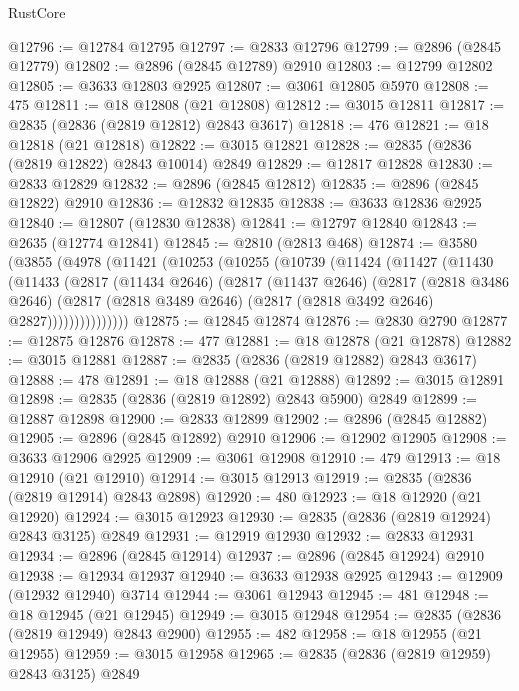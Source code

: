 \begin{lexlean}{RustCore}
\begin{coremodule}
@12796 := @12784 @12795
@12797 := @2833 @12796
@12799 := @2896 (@2845 @12779)
@12802 := @2896 (@2845 @12789) @2910
@12803 := @12799 @12802
@12805 := @3633 @12803 @2925
@12807 := @3061 @12805 @5970
@12808 := 475
@12811 := @18 @12808 (@21 @12808)
@12812 := @3015 @12811
@12817 := @2835 (@2836 (@2819 @12812) @2843 @3617)
@12818 := 476
@12821 := @18 @12818 (@21 @12818)
@12822 := @3015 @12821
@12828 := @2835 (@2836 (@2819 @12822) @2843 @10014) @2849
@12829 := @12817 @12828
@12830 := @2833 @12829
@12832 := @2896 (@2845 @12812)
@12835 := @2896 (@2845 @12822) @2910
@12836 := @12832 @12835
@12838 := @3633 @12836 @2925
@12840 := @12807 (@12830 @12838)
@12841 := @12797 @12840
@12843 := @2635 (@12774 @12841)
@12845 := @2810 (@2813 @468)
@12874 := @3580
    (@3855
      (@4978
        (@11421
          (@10253
            (@10255
              (@10739
                (@11424
                  (@11427
                    (@11430
                      (@11433
                        (@2817
                          (@11434 @2646)
                          (@2817
                            (@11437 @2646)
                            (@2817
                              (@2818 @3486 @2646)
                              (@2817
                                (@2818 @3489 @2646)
                                (@2817 (@2818 @3492 @2646) @2827)))))))))))))))
@12875 := @12845 @12874
@12876 := @2830 @2790
@12877 := @12875 @12876
@12878 := 477
@12881 := @18 @12878 (@21 @12878)
@12882 := @3015 @12881
@12887 := @2835 (@2836 (@2819 @12882) @2843 @3617)
@12888 := 478
@12891 := @18 @12888 (@21 @12888)
@12892 := @3015 @12891
@12898 := @2835 (@2836 (@2819 @12892) @2843 @5900) @2849
@12899 := @12887 @12898
@12900 := @2833 @12899
@12902 := @2896 (@2845 @12882)
@12905 := @2896 (@2845 @12892) @2910
@12906 := @12902 @12905
@12908 := @3633 @12906 @2925
@12909 := @3061 @12908
@12910 := 479
@12913 := @18 @12910 (@21 @12910)
@12914 := @3015 @12913
@12919 := @2835 (@2836 (@2819 @12914) @2843 @2898)
@12920 := 480
@12923 := @18 @12920 (@21 @12920)
@12924 := @3015 @12923
@12930 := @2835 (@2836 (@2819 @12924) @2843 @3125) @2849
@12931 := @12919 @12930
@12932 := @2833 @12931
@12934 := @2896 (@2845 @12914)
@12937 := @2896 (@2845 @12924) @2910
@12938 := @12934 @12937
@12940 := @3633 @12938 @2925
@12943 := @12909 (@12932 @12940) @3714
@12944 := @3061 @12943
@12945 := 481
@12948 := @18 @12945 (@21 @12945)
@12949 := @3015 @12948
@12954 := @2835 (@2836 (@2819 @12949) @2843 @2900)
@12955 := 482
@12958 := @18 @12955 (@21 @12955)
@12959 := @3015 @12958
@12965 := @2835 (@2836 (@2819 @12959) @2843 @3125) @2849

\end{coremodule}
\end{lexlean}
